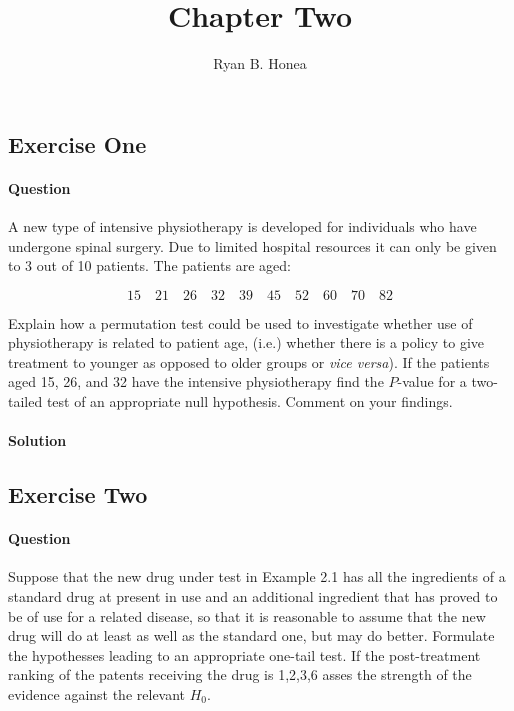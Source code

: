 \documentclass[]{article}
\title{Chapter Two}
\author{Ryan B. Honea}
\date{}
\let\oldparagraph\paragraph
\renewcommand{\paragraph}[1]{\oldparagraph{#1}\mbox{}}
\begin{document}
\maketitle

\subsection{Exercise One}\label{exercise-one}

\paragraph{Question}\label{question}

A new type of intensive physiotherapy is developed for individuals who
have undergone spinal surgery. Due to limited hospital resources it can
only be given to 3 out of 10 patients. The patients are aged:

\[
  15\quad21\quad26\quad32\quad39\quad45\quad52\quad60\quad70\quad82
\]

Explain how a permutation test could be used to investigate whether use
of physiotherapy is related to patient age, (i.e.) whether there is a
policy to give treatment to younger as opposed to older groups or
\emph{vice versa}). If the patients aged 15, 26, and 32 have the
intensive physiotherapy find the \(P\)-value for a two-tailed test of an
appropriate null hypothesis. Comment on your findings.

\paragraph{Solution}\label{solution}

\subsection{Exercise Two}\label{exercise-two}

\paragraph{Question}\label{question-1}

Suppose that the new drug under test in Example 2.1 has all the
ingredients of a standard drug at present in use and an additional
ingredient that has proved to be of use for a related disease, so that
it is reasonable to assume that the new drug will do at least as well as
the standard one, but may do better. Formulate the hypothesses leading
to an appropriate one-tail test. If the post-treatment ranking of the
patents receiving the drug is 1,2,3,6 asses the strength of the evidence
against the relevant \(H_0\).
\end{document}
